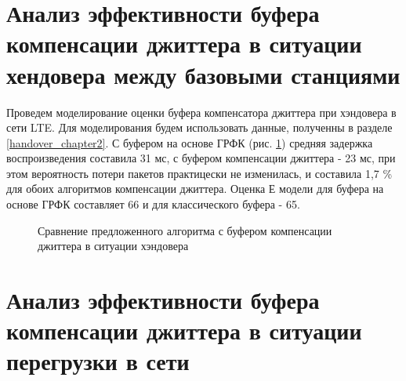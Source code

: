 \clearpage
















\section{Анализ эффективности буфера компенсации джиттера в ситуации хендовера между базовыми станциями} \label{sect4}


Проведем моделирование оценки буфера компенсатора джиттера при хэндовера в сети LTE. Для моделирования будем использовать данные, полученны в разделе \ref{handover_chapter2}. С буфером на основе ГРФК (рис. \ref{img4:handBuff}) средняя задержка воспроизведения составила 31 мс, с буфером компенсации джиттера \cite{Ramjee} - 23 мс, при этом вероятность потери пакетов практицески не изменилась, и составила 1,7 \% для обоих алгоритмов компенсации джиттера. Оценка Е модели для буфера на основе ГРФК составляет 66 и для классического буфера - 65.


\pgfplotsset{width=15cm, height=10cm, compat=1.3}
\begin{figure} [!h]
  \center
{}
\caption{Сравнение предложенного алгоритма с буфером компенсации джиттера \cite{Ramjee} в ситуации хэндовера}
  \label{img4:handBuff}
\end{figure}


\section{Анализ эффективности буфера компенсации джиттера в ситуации перегрузки в сети} \label{sect4}

